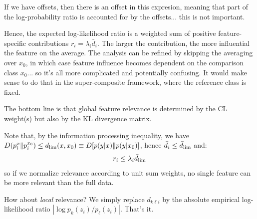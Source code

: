 \documentclass[english]{scrartcl}
\begin{document}
If we have offsets, then there is an offset in this expresion, meaning that part of the log-probability ratio is accounted for by the offsets... this is not important.

Hence, the expected log-likelihood ratio is a weighted sum of positive feature-specific contributions $r_i=\lambda_i \bar{d}_i$. The larger the contribution, the more influential the feature on the average. The analysis can be refined by skipping the averaging over $x_0$, in which case feature influence becomes dependent on the comparison class $x_0$... so it's all more complicated and potentially confusing. It would make sense to do that in the super-composite framework, where the reference class is fixed.

The bottom line is that global feature relevance is determined by the CL weight(s) but also by the KL divergence matrix. 

Note that, by the information processing inequality, we have $D(p_i^x\|p_i^{x_0}) \leq d_{\rm lim}(x,x_0)\equiv D[p(y|x)\|p(y|x_0)]$, hence $\bar{d}_i\leq \bar{d}_{\rm lim}$ and:
$$
r_i \leq \lambda_i \bar{d}_{\rm lim}
$$
so if we normalize relevance according to unit sum weights, no single feature can be more relevant than the full data. 

How about {\em local} relevance? We simply replace $d_{k\ell i}$ by the absolute empirical log-likelihood ratio $|\log p_k(z_i)/p_\ell(z_i)|$. That's it.




\end{document}
